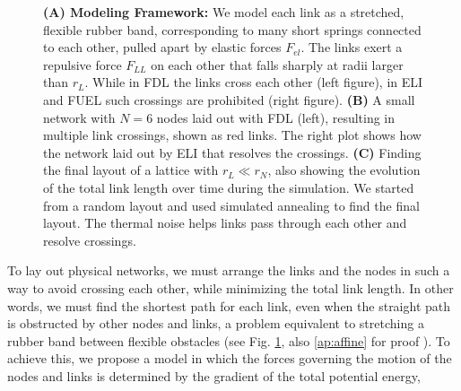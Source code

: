 \documentclass[endfloats,nofootinbib,preprint,floatfix,titlepage,superscriptaddress,linenumbers]{revtex4-1} %
\begin{document}
\begin{figure}
    \caption{
    \scriptsize
    {\bf(A) Modeling Framework:} We model each link as a stretched, flexible rubber band, 
    corresponding to many short springs connected to each other, pulled apart by
    elastic forces $F_{el}$. 
    The links exert a repulsive force $F_{LL}$  on each other that falls sharply at radii larger than $r_L$. 
    While in FDL the links cross each other (left figure), in ELI and FUEL such crossings are prohibited (right figure). 
    {\bf(B)} A small network with $N=6$ nodes laid out with FDL (left), resulting in multiple link crossings, shown as red links.   
    The right plot shows how the network laid out by ELI that resolves the crossings.
    {\bf (C)} Finding the final layout of a lattice with $r_L\ll r_N$, also showing the evolution of the total link length over time during the simulation. 
    We started from a random layout and used simulated annealing to find the final layout.
    The thermal noise helps links pass through each other and resolve crossings.
    \vspace{-1cm}}
    \label{fig:crs-lat}
\end{figure}
\begin{linenumbers}
To lay out physical networks, we must arrange the links and the nodes in such a way to avoid crossing each other, while minimizing the total link length. 
In other words, we must find the shortest path for each link, even when the straight path is obstructed by other nodes and links, a problem equivalent to stretching a rubber band between flexible obstacles (see Fig. \ref{fig:crs-lat}, also \ref{ap:affine} for proof \cite{novikov1984}). 
To achieve this, we propose a model in which the forces governing the motion of the nodes and links is determined by the gradient of the total potential energy,
\end{linenumbers}
\end{document}
